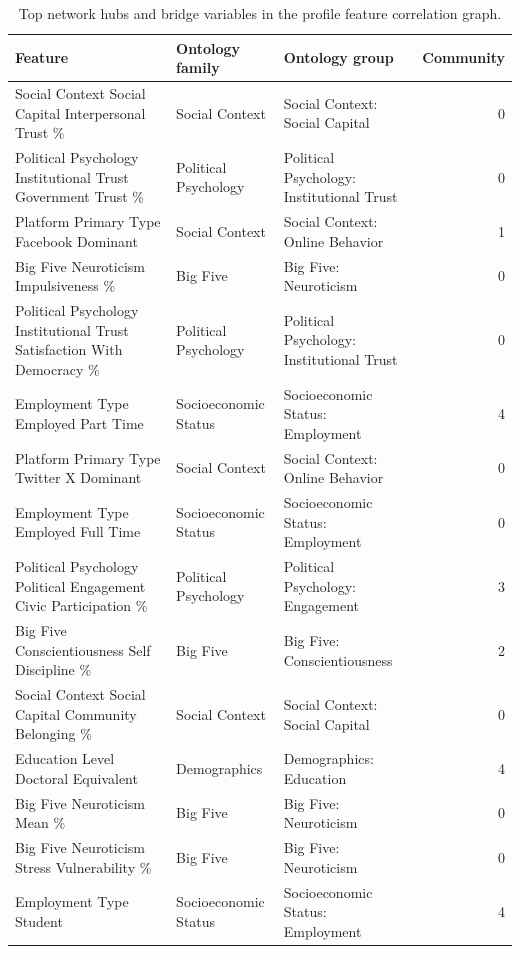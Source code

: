 \begin{table}[htbp]
\centering
\begin{threeparttable}
\caption{Top network hubs and bridge variables in the profile feature correlation graph.}
\label{tab:networksummary}
\small
\setlength{\tabcolsep}{4.5pt}
\renewcommand{\arraystretch}{1.10}
\begin{tabular}{lllr}
\toprule
Feature & Ontology family & Ontology group & Community \\
\midrule
Social Context Social Capital Interpersonal Trust \% & Social Context & Social Context: Social Capital & 0 \\
Political Psychology Institutional Trust Government Trust \% & Political Psychology & Political Psychology: Institutional Trust & 0 \\
Platform Primary Type Facebook Dominant & Social Context & Social Context: Online Behavior & 1 \\
Big Five Neuroticism Impulsiveness \% & Big Five & Big Five: Neuroticism & 0 \\
Political Psychology Institutional Trust Satisfaction With Democracy \% & Political Psychology & Political Psychology: Institutional Trust & 0 \\
Employment Type Employed Part Time & Socioeconomic Status & Socioeconomic Status: Employment & 4 \\
Platform Primary Type Twitter X Dominant & Social Context & Social Context: Online Behavior & 0 \\
Employment Type Employed Full Time & Socioeconomic Status & Socioeconomic Status: Employment & 0 \\
Political Psychology Political Engagement Civic Participation \% & Political Psychology & Political Psychology: Engagement & 3 \\
Big Five Conscientiousness Self Discipline \% & Big Five & Big Five: Conscientiousness & 2 \\
Social Context Social Capital Community Belonging \% & Social Context & Social Context: Social Capital & 0 \\
Education Level Doctoral Equivalent & Demographics & Demographics: Education & 4 \\
Big Five Neuroticism Mean \% & Big Five & Big Five: Neuroticism & 0 \\
Big Five Neuroticism Stress Vulnerability \% & Big Five & Big Five: Neuroticism & 0 \\
Employment Type Student & Socioeconomic Status & Socioeconomic Status: Employment & 4 \\

\end{tabular}
\end{threeparttable}
\end{table}
